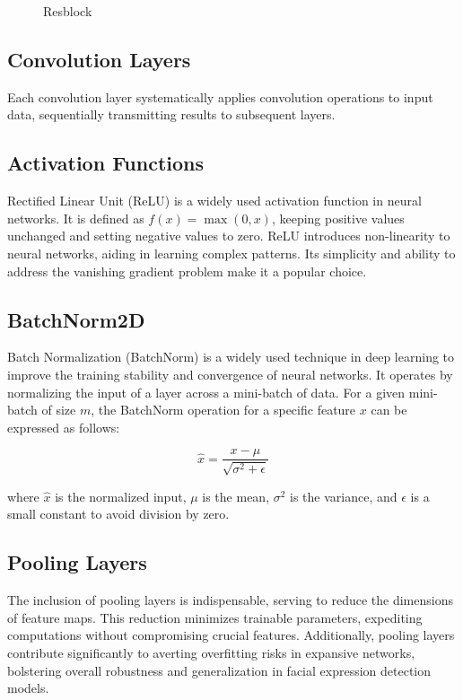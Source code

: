 \begin{figure}[h]
	\centering
	
	\caption{Resblock}
	\label{fig:resblock}
\end{figure}

\subsection{Convolution Layers}
Each convolution layer systematically applies convolution operations to input data, sequentially transmitting results to subsequent layers.

\subsection{Activation Functions}
Rectified Linear Unit (ReLU) is a widely used activation function in neural networks. It is defined as $f(x) = \max(0, x)$, keeping positive values unchanged and setting negative values to zero. ReLU introduces non-linearity to neural networks, aiding in learning complex patterns. Its simplicity and ability to address the vanishing gradient problem make it a popular choice.

\subsection{BatchNorm2D}
Batch Normalization (BatchNorm) is a widely used technique in deep learning to improve the training stability and convergence of neural networks. It operates by normalizing the input of a layer across a mini-batch of data. For a given mini-batch of size \(m\), the BatchNorm operation for a specific feature \(x\) can be expressed as follows:

\begin{equation}
	\hat{x} = \frac{x - \mu}{\sqrt{\sigma^2 + \epsilon}}
\end{equation}

where \(\hat{x}\) is the normalized input, \(\mu\) is the mean, \(\sigma^2\) is the variance, and \(\epsilon\) is a small constant to avoid division by zero.


\subsection{Pooling Layers}
The inclusion of pooling layers is indispensable, serving to reduce the dimensions of feature maps. This reduction minimizes trainable parameters, expediting computations without compromising crucial features. Additionally, pooling layers contribute significantly to averting overfitting risks in expansive networks, bolstering overall robustness and generalization in facial expression detection models.


